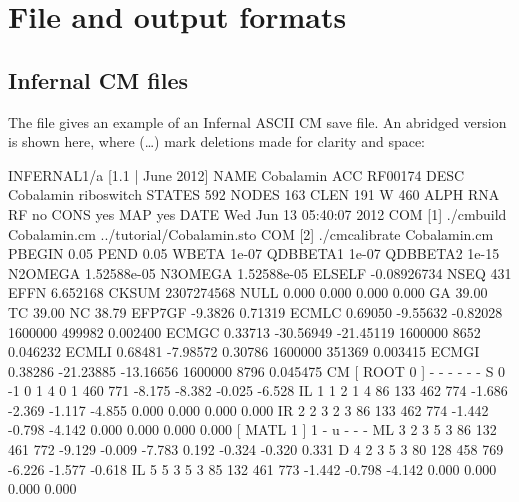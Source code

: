 \section{File and output formats}
\label{section:formats}
\setcounter{footnote}{0}

\subsection{Infernal CM files}
\label{section:savefiles}

The file  gives an example of an Infernal ASCII
CM save file. An abridged version is shown here, where (\ldots) mark
deletions made for clarity and space:

\begin{tinysreoutput}
INFERNAL1/a [1.1 | June 2012]
NAME     Cobalamin
ACC      RF00174
DESC     Cobalamin riboswitch
STATES   592
NODES    163
CLEN     191
W        460
ALPH     RNA
RF       no
CONS     yes
MAP      yes
DATE     Wed Jun 13 05:40:07 2012
COM      [1] ./cmbuild Cobalamin.cm ../tutorial/Cobalamin.sto
COM      [2] ./cmcalibrate Cobalamin.cm
PBEGIN   0.05
PEND     0.05
WBETA    1e-07
QDBBETA1 1e-07
QDBBETA2 1e-15
N2OMEGA  1.52588e-05
N3OMEGA  1.52588e-05
ELSELF   -0.08926734
NSEQ     431
EFFN     6.652168
CKSUM    2307274568
NULL     0.000  0.000  0.000  0.000 
GA       39.00
TC       39.00
NC       38.79
EFP7GF   -9.3826 0.71319
ECMLC    0.69050    -9.55632    -0.82028     1600000      499982  0.002400
ECMGC    0.33713   -30.56949   -21.45119     1600000        8652  0.046232
ECMLI    0.68481    -7.98572     0.30786     1600000      351369  0.003415
ECMGI    0.38286   -21.23885   -13.16656     1600000        8796  0.045475
CM
                                             [ ROOT    0 ]      -      - - - - -
     S     0    -1 0     1     4     0     1   460   771  -8.175  -8.382  -0.025  -6.528                 
    IL     1     1 2     1     4    86   133   462   774  -1.686  -2.369  -1.117  -4.855                  0.000  0.000  0.000  0.000 
    IR     2     2 3     2     3    86   133   462   774  -1.442  -0.798  -4.142                          0.000  0.000  0.000  0.000 
                                             [ MATL    1 ]      1      - u - - -
    ML     3     2 3     5     3    86   132   461   772  -9.129  -0.009  -7.783                          0.192 -0.324 -0.320  0.331 
     D     4     2 3     5     3    80   128   458   769  -6.226  -1.577  -0.618                         
    IL     5     5 3     5     3    85   132   461   773  -1.442  -0.798  -4.142                          0.000  0.000  0.000  0.000 

\end{tinysreoutput}
